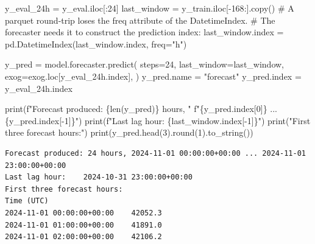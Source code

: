 \documentclass[
  english,
  letterpaper,
]{scrbook}
\newenvironment{Shaded}{\begin{snugshade}}{\end{snugshade}}
\newcommand{\BuiltInTok}[1]{\textcolor[rgb]{0.00,0.23,0.31}{#1}}
\newcommand{\CommentTok}[1]{\textcolor[rgb]{0.37,0.37,0.37}{#1}}
\newcommand{\DecValTok}[1]{\textcolor[rgb]{0.68,0.00,0.00}{#1}}
\newcommand{\NormalTok}[1]{\textcolor[rgb]{0.00,0.23,0.31}{#1}}
\newcommand{\OperatorTok}[1]{\textcolor[rgb]{0.37,0.37,0.37}{#1}}
\newcommand{\SpecialCharTok}[1]{\textcolor[rgb]{0.37,0.37,0.37}{#1}}
\newcommand{\SpecialStringTok}[1]{\textcolor[rgb]{0.13,0.47,0.30}{#1}}
\newcommand{\StringTok}[1]{\textcolor[rgb]{0.13,0.47,0.30}{#1}}
\begin{document}
\protect{}\label{predict-24h}
\begin{Shaded}
\begin{Highlighting}[]
\NormalTok{y\_eval\_24h }\OperatorTok{=}\NormalTok{ y\_eval.iloc[:}\DecValTok{24}\NormalTok{]}
\NormalTok{last\_window }\OperatorTok{=}\NormalTok{ y\_train.iloc[}\OperatorTok{{-}}\DecValTok{168}\NormalTok{:].copy()}
\CommentTok{\# A parquet round{-}trip loses the \textasciigrave{}freq\textasciigrave{} attribute of the DatetimeIndex.}
\CommentTok{\# The forecaster needs it to construct the prediction index:}
\NormalTok{last\_window.index }\OperatorTok{=}\NormalTok{ pd.DatetimeIndex(last\_window.index, freq}\OperatorTok{=}\StringTok{"h"}\NormalTok{)}

\NormalTok{y\_pred }\OperatorTok{=}\NormalTok{ model.forecaster.predict(}
\NormalTok{    steps}\OperatorTok{=}\DecValTok{24}\NormalTok{,}
\NormalTok{    last\_window}\OperatorTok{=}\NormalTok{last\_window,}
\NormalTok{    exog}\OperatorTok{=}\NormalTok{exog.loc[y\_eval\_24h.index],}
\NormalTok{)}
\NormalTok{y\_pred.name }\OperatorTok{=} \StringTok{"forecast"}
\NormalTok{y\_pred.index }\OperatorTok{=}\NormalTok{ y\_eval\_24h.index}

\BuiltInTok{print}\NormalTok{(}\SpecialStringTok{f"Forecast produced: }\SpecialCharTok{\{}\BuiltInTok{len}\NormalTok{(y\_pred)}\SpecialCharTok{\}}\SpecialStringTok{ hours, "}
      \SpecialStringTok{f"}\SpecialCharTok{\{}\NormalTok{y\_pred}\SpecialCharTok{.}\NormalTok{index[}\DecValTok{0}\NormalTok{]}\SpecialCharTok{\}}\SpecialStringTok{ ... }\SpecialCharTok{\{}\NormalTok{y\_pred}\SpecialCharTok{.}\NormalTok{index[}\OperatorTok{{-}}\DecValTok{1}\NormalTok{]}\SpecialCharTok{\}}\SpecialStringTok{"}\NormalTok{)}
\BuiltInTok{print}\NormalTok{(}\SpecialStringTok{f"Last lag hour:    }\SpecialCharTok{\{}\NormalTok{last\_window}\SpecialCharTok{.}\NormalTok{index[}\OperatorTok{{-}}\DecValTok{1}\NormalTok{]}\SpecialCharTok{\}}\SpecialStringTok{"}\NormalTok{)}
\BuiltInTok{print}\NormalTok{(}\StringTok{"First three forecast hours:"}\NormalTok{)}
\BuiltInTok{print}\NormalTok{(y\_pred.head(}\DecValTok{3}\NormalTok{).}\BuiltInTok{round}\NormalTok{(}\DecValTok{1}\NormalTok{).to\_string())}
\end{Highlighting}
\end{Shaded}

\begin{verbatim}
Forecast produced: 24 hours, 2024-11-01 00:00:00+00:00 ... 2024-11-01 23:00:00+00:00
Last lag hour:    2024-10-31 23:00:00+00:00
First three forecast hours:
Time (UTC)
2024-11-01 00:00:00+00:00    42052.3
2024-11-01 01:00:00+00:00    41891.0
2024-11-01 02:00:00+00:00    42106.2
\end{verbatim}
\end{document}
